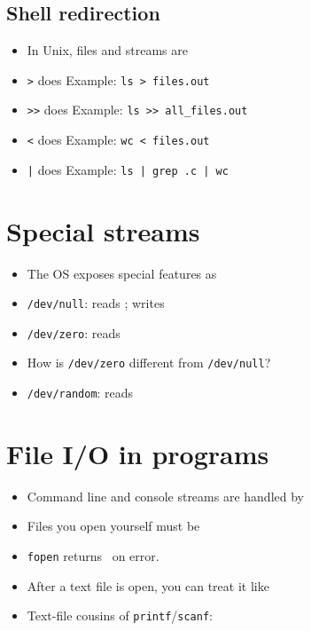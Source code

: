 \documentclass[12pt]{article}
\begin{document}
\subsection{Shell redirection}
\begin{itemize}[leftmargin=*]
  \item In Unix, files and streams are \hrulefill
  \item \texttt{>} does \hrulefill \quad Example: \texttt{ls > files.out}
  \item \texttt{>>} does \hrulefill \quad Example: \texttt{ls >> all\_files.out}
  \item \texttt{<} does \hrulefill \quad Example: \texttt{wc < files.out}
  \item \texttt{|} does \hrulefill \quad Example: \texttt{ls | grep .c | wc}
\end{itemize}

\vspace{1.2em}

\section{Special streams}

\begin{itemize}[leftmargin=*]
  \item The OS exposes special features as \hrulefill
  \item \texttt{/dev/null}: reads \hrulefill; writes \hrulefill
  \item \texttt{/dev/zero}: reads \hrulefill
  \item How is \texttt{/dev/zero} different from \texttt{/dev/null}? \hrulefill
  \item \texttt{/dev/random}: reads \hrulefill
\end{itemize}

\vspace{1.2em}

\section{File I/O in programs}

\begin{itemize}[leftmargin=*]
  \item Command line and console streams are handled by \hrulefill
  \item Files you open yourself must be \hrulefill
  \item \texttt{fopen} returns \hrulefill\ on error.
  \item After a text file is open, you can treat it like \hrulefill
  \item Text-file cousins of \texttt{printf}/\texttt{scanf}: \hrulefill
\end{itemize}
\end{document}
